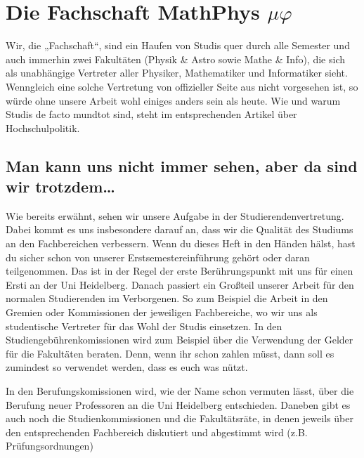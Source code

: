 \section{Die Fachschaft MathPhys $\mu\varphi$}
Wir, die „Fachschaft“, sind ein Haufen von Studis quer durch alle Semester und auch immerhin zwei Fakultäten (Physik \& Astro sowie Mathe \& Info), die sich als unabhängige Vertreter aller Physiker, Mathematiker und Informatiker sieht. Wenngleich eine solche Vertretung von offizieller Seite aus nicht vorgesehen ist, so würde ohne unsere Arbeit wohl einiges anders sein als heute. Wie und warum Studis de facto mundtot sind, steht im entsprechenden Artikel über Hochschulpolitik.

\subsection*{Man kann uns nicht immer sehen, aber da sind wir trotzdem\dots}
Wie bereits erwähnt, sehen wir unsere Aufgabe in der Studierendenvertretung. Dabei kommt es uns insbesondere darauf an, dass wir die Qualität des Studiums an den Fachbereichen verbessern.
Wenn du dieses Heft in den Händen hälst, hast du sicher schon von unserer Erstsemestereinführung gehört oder daran teilgenommen. Das ist in der Regel der erste Berührungspunkt mit uns für einen Ersti an der Uni Heidelberg.
Danach passiert ein Großteil unserer Arbeit für den normalen Studierenden im Verborgenen. So zum Beispiel die Arbeit in den Gremien oder Kommissionen der jeweiligen Fachbereiche, wo wir uns als studentische Vertreter für das Wohl der Studis einsetzen. In den Studiengebührenkomissionen wird zum Beispiel über die Verwendung der Gelder für die Fakultäten beraten. Denn, wenn ihr schon zahlen müsst, dann soll es zumindest so verwendet werden, dass es euch was nützt.

In den Berufungskomissionen wird, wie der Name schon vermuten lässt, über die Berufung neuer Professoren an die Uni Heidelberg entschieden. Daneben gibt es auch noch die Studienkommissionen und die Fakultätsräte, in denen jeweils über den entsprechenden Fachbereich diskutiert und abgestimmt wird (z.B. Prüfungsordnungen)

